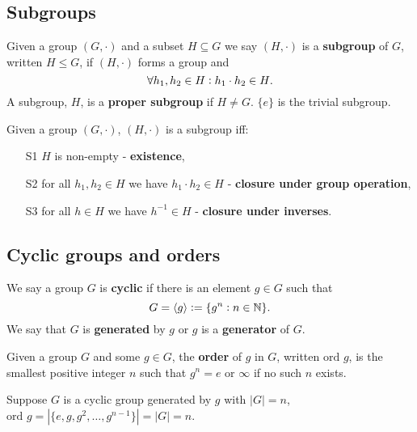 \subsection{Subgroups}

\begin{definition}[Subgroup]
    Given a group $(G,\cdot)$ and a subset $H\subseteq G$ we say $(H,\cdot)$ is a \textbf{subgroup} of $G$, written $H\leq G$, if $(H,\cdot)$ forms a group and \[
    \forall h_1,h_2\in H: h_1\cdot h_2\in H
    \textcolor{black}{.}
    \]
    A subgroup, $H$, is a \textbf{proper subgroup} if $H\neq G$. $\{e\}$ is the trivial subgroup.
\end{definition}

\begin{theorem}
    Given a group $(G,\cdot)$, $(H,\cdot)$ is a subgroup iff: \begin{enumerate}
        \item[S1] $H$ is non-empty - \textbf{existence},
        \item[S2] for all $h_1,h_2\in H$ we have $h_1\cdot h_2\in H$ - \textbf{closure under group operation},
        \item[S3] for all $h\in H$ we have $h^{-1}\in H$ - \textbf{closure under inverses}.
    \end{enumerate}
\end{theorem}

\subsection{Cyclic groups and orders}

\begin{definition}
    We say a group $G$ is \textbf{cyclic} if there is an element $g\in G$ such that \[
    G = \left\langle g \right\rangle := \{g^n:n\in\mathbb{N}\} 
    \textcolor{black}{.}
    \]
    We say that $G$ is \textbf{generated} by $g$ or $g$ is a \textbf{generator} of $G$.
\end{definition}

\begin{definition}
    Given a group $G$ and some $g\in G$, the \textbf{order} of $g$ in $G$, written $\text{ord }g$, is the smallest positive integer $n$ such that $g^n = e$ or $\infty$ if no such $n$ exists.
\end{definition}

\begin{theorem}
    Suppose $G$ is a cyclic group generated by $g$ with $|G| = n$, $\text{ord }g = |\{e,g,g^2,\ldots,g^{n-1}\}| = |G| = n$.
\end{theorem}

